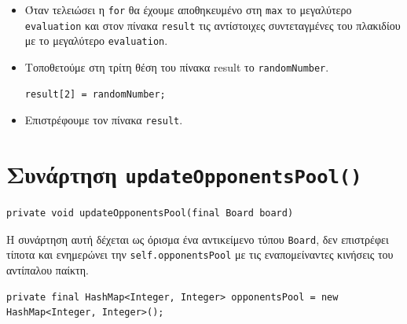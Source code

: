 \begin{itemize}
\item Όταν τελειώσει η \lstinline!for! θα έχουμε αποθηκευμένο στη \lstinline!max! το μεγαλύτερο \lstinline!evaluation! και στον πίνακα \lstinline!result! τις 
αντίστοιχες συντεταγμένες του πλακιδίου με το μεγαλύτερο \lstinline!evaluation!.

\item Τοποθετούμε στη τρίτη θέση του πίνακα result το \lstinline!randomNumber!.
\begin{lstlisting}[breaklines=true, numbers=none, aboveskip=\smallskipamount, belowskip=\smallskipamount, captionpos=none]
result[2] = randomNumber;
\end{lstlisting}

\item Επιστρέφουμε τον πίνακα \lstinline!result!.
\end{itemize}

\section{Συνάρτηση \texttt{updateOpponentsPool()}} \label{sec:updateOpponentsPool}
\begin{lstlisting}[numbers=none, title={Declaration της συνάρτησης}]
private void updateOpponentsPool(final Board board)
\end{lstlisting}
Η συνάρτηση αυτή δέχεται ως όρισμα ένα αντικείμενο τύπου \lstinline!Board!,
δεν επιστρέφει τίποτα και
ενημερώνει την \lstinline!self.opponentsPool! με τις εναπομείναντες κινήσεις του αντίπαλου παίκτη.
\begin{lstlisting}[numbers=none, breaklines=true, title={Declaration της \lstinline!opponentsPool!}]
private final HashMap<Integer, Integer> opponentsPool = new HashMap<Integer, Integer>();
\end{lstlisting}

